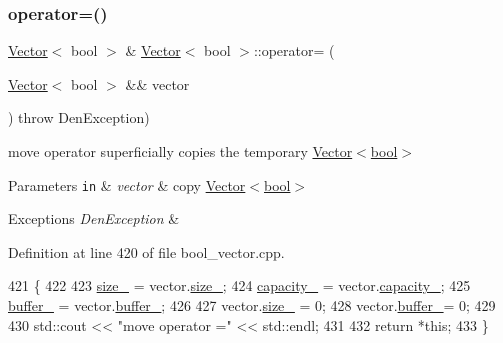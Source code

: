\subsubsection{\texorpdfstring{operator=()}{operator=()}\hspace{0.1cm}{\footnotesize\ttfamily [2/2]}}
{\footnotesize\ttfamily \hyperlink{classVector}{Vector}$<$ bool $>$ \& \hyperlink{classVector}{Vector}$<$ bool $>$\+::operator= (\begin{DoxyParamCaption}\item[{\hyperlink{classVector}{Vector}$<$ bool $>$ \&\&}]{vector }\end{DoxyParamCaption}) throw  Den\+Exception) }



move operator  superficially copies the temporary \hyperlink{classVector_3_01bool_01_4}{Vector$<$bool$>$} 


\begin{DoxyParams}[1]{Parameters}
\mbox{\tt in}  & {\em vector} & copy \hyperlink{classVector_3_01bool_01_4}{Vector$<$bool$>$} \\
\hline
\end{DoxyParams}

\begin{DoxyExceptions}{Exceptions}
{\em Den\+Exception} & \\
\hline
\end{DoxyExceptions}


Definition at line 420 of file bool\+\_\+vector.\+cpp.


\begin{DoxyCode}
421         \{
422 
423             \hyperlink{classVector_3_01bool_01_4_a07895adb41b2c819f85640e35c0d4ae0}{size\_} = vector.\hyperlink{classVector_a3c70fa478530a90177f2a7e7621ee688}{size\_};
424             \hyperlink{classVector_3_01bool_01_4_ac3da0e4580bca55cab445ed3f9c50f2d}{capacity\_} = vector.\hyperlink{classVector_ad75911bb39018821f0e2911b6905b7ec}{capacity\_};
425             \hyperlink{classVector_3_01bool_01_4_ae2183c11de877eb13209c6a5a593604f}{buffer\_} = vector.\hyperlink{classVector_a22db58ae9e92c6014e8ac657804a035a}{buffer\_};
426 
427             vector.\hyperlink{classVector_a3c70fa478530a90177f2a7e7621ee688}{size\_} = 0;
428             vector.\hyperlink{classVector_a22db58ae9e92c6014e8ac657804a035a}{buffer\_}= 0;
429 
430             std::cout << \textcolor{stringliteral}{"move operator ="} << std::endl;
431 
432             \textcolor{keywordflow}{return} *\textcolor{keyword}{this};
433         \}
\end{DoxyCode}
\mbox{\label{classVector_3_01bool_01_4_a0668d217d484d3486b4b70583b3a6f1f}} 
